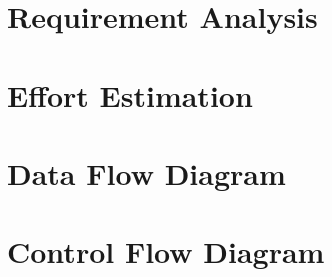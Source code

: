 \documentclass{llncs}
\begin{document}
\section{Requirement Analysis}
 
\newpage

\section{Effort Estimation}
 


\section{Data Flow Diagram}
 \newpage

\section{Control Flow Diagram}








\end{document}
